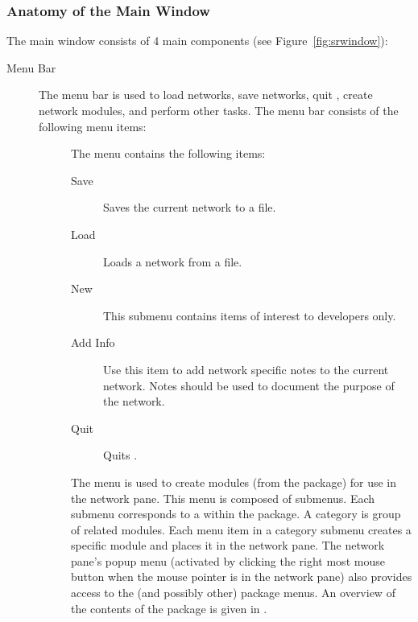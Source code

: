 \subsubsection{Anatomy of the Main Window}
\label{sec:windowanatomy}

The \sr{} main window consists of 4 main components (see
Figure~\ref{fig:srwindow}): 

\begin{description}
\item[Menu Bar] The menu bar is used to load networks, save networks, quit
  \sr, create network modules, and perform other tasks.  The menu bar
  consists of the following menu items:

  \begin{description}
  \item[] The  menu contains the following items:
    \begin{description}
    \item[Save] Saves the current network to a file.
    \item[Load] Loads a network from a file.
    \item[New] This submenu contains items of interest to developers only.
    \item[Add Info] Use this item to add network specific notes to
      the current network.  Notes should be used to document the purpose of
      the network.
    \item[Quit] Quits \sr.
    \end{description}
  \end{description}
  
  \begin{description}
  \item[] The  menu is used to create modules
    (from the \sr{} package) for use in the network pane.  This menu is
    composed of submenus. Each submenu corresponds to a 
     within the \sr{} package.  A category is group of
    related modules.  Each menu item in a category submenu creates a
    specific module and places it in the network pane.  The network pane's
    popup menu (activated by clicking the right most mouse button when the
    mouse pointer is in the network pane) also provides access to the
     (and possibly other) package menus.  An overview of the
    contents of the \sr{} package is given in .
  \end{description}


\end{description}
